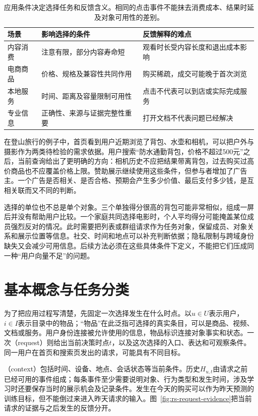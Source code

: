 \begin{table}[htbp]
  \centering
  \begin{tabularx}{\linewidth}{@{}lXX@{}}
    \toprule
    场景 & 影响选择的条件 & 反馈解释的难点 \\
    \midrule
    内容消费 & 注意有限，部分内容寿命短 & 观看时长受内容长度和退出成本影响 \\
    电商商品 & 价格、规格及兼容性共同作用 & 购买稀疏，成交可能晚于首次浏览 \\
    本地服务 & 时间、距离及容量限制可用性 & 点击不代表可以到店或实际完成服务 \\
    专业信息 & 正确性、来源与证据完整性重要 & 打开文档不代表问题已经解决 \\
    \bottomrule
  \end{tabularx}
  \caption{应用条件决定选择任务和反馈含义。相同的点击事件不能抹去消费成本、结果时延及对象可用性的差别。}
  \label{tab:rs-scenarios}
\end{table}

在登山旅行的例子中，首页看到用户近期浏览了背包、水壶和相机，可以把户外与摄影作为两类待检验的需求依据。用户搜索“防水通勤背包，价格不超过500元”之后，当前查询给出了更明确的方向：相机历史不应把结果带离背包，过去购买过高价商品也不应覆盖价格上限。赞助展示继续使用这些条件，但参与者增加了广告主。一个广告是否相关、是否合格、预期会产生多少价值、最后支付多少钱，是互相关联而又不同的判断。

选择的单位也不总是单个对象。三个单独得分很高的背包可能非常相似，组成一屏后并没有帮助用户比较。一个家庭共同选择电影时，个人平均得分可能掩盖某位成员强烈反对的情况。此时需要把列表或群组请求作为任务对象，保留成员、对象关系和展示位置等信息。社交、时间和地点可以补充判断依据；隐私限制与跨域身份缺失又会减少可用信息。后续方法必须在这些具体条件下定义，不能把它们压成同一种“用户向量不足”的问题。

\section{基本概念与任务分类}
\label{sec:rs-concepts}

为了把应用过程写清楚，先固定一次选择发生在什么时点。以$u\in U$表示用户，$i\in I$表示目录中的物品；“物品”在此泛指可选择的真实条目，可以是商品、视频、文档或服务。用户身份连接被允许使用的信息，物品标识连接对象事实和状态。一次（request）则给出当前决策时点$t$，以及这次选择的入口、表达和可观察条件。同一用户在首页和搜索页发出的请求，可能具有不同目标。

（context）包括时间、设备、地点、会话状态等当前条件。历史$H_{u,t}$由请求之前已经可用的事件组成；每条事件至少需要说明对象、行为类型和发生时间，涉及学习时还要保存当时的展示机会及记录条件。发生在今天的购买可以作为昨天预测的训练目标，但不能倒过来进入昨天请求的输入。图~\ref{fig:rs-request-evidence}把当前请求的证据与之后发生的反馈分开。

